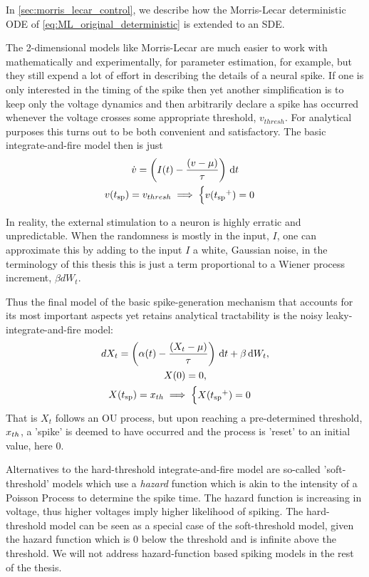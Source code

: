 In \cref{sec:morris_lecar_control}, we describe how the Morris-Lecar
deterministic ODE of \cref{eq:ML_original_deterministic} is extended to an SDE.   
 
The 2-dimensional models like Morris-Lecar are much easier to work with
mathematically and experimentally, for parameter estimation, for example, but
they still expend a lot of effort in describing the details of a neural spike.
If one is only interested in the timing of the spike then yet another
simplification is to keep only the voltage dynamics and then arbitrarily declare
a spike has occurred whenever the voltage crosses some appropriate threshold,
$v_{thresh}$. For analytical purposes this turns out to be both convenient and
satisfactory. The basic integrate-and-fire model then is just
\begin{equation}
\begin{gathered}
\dot{v} = \left(I(t) - \frac{(v - {\mu })}{{ \tau }} \right) \, \mathrm{d} t 
\\
v({ t_{\textrm{sp} } }) = v_{thresh} \implies  
\begin{cases}
v({ t_{\textrm{sp} } }^+) = 0 &  
\end{cases}
\end{gathered}
\label{eq:deterministic_IF}
\end{equation}

In reality, the external stimulation to a neuron is highly erratic and
unpredictable. When the randomness is mostly in the input, $I$,
one can approximate this by adding to the input $I$ a white, Gaussian
noise, in the terminology of this thesis this is just a term proportional to
a Wiener process increment, $\beta dW_t$.

Thus the final model of the basic spike-generation mechanism that accounts for
its most important aspects yet retains analytical tractability is the noisy
leaky-integrate-and-fire model:
\begin{equation}
\begin{gathered}
dX_t = \left(\alpha(t) - \frac{(X_t - {\mu })}{{ \tau }} \right) \, \mathrm{d} t + \beta \, \mathrm{d} W_t,
\\
X(0) = 0,
\\
X({ t_{\textrm{sp} } }) = { x_{th} } \implies  
\begin{cases}
X({ t_{\textrm{sp} } }^+) = 0 &  
\end{cases}
\end{gathered}
\label{eq:X_evolution_uo}
\end{equation}
That is $X_t$ follows an OU process, but upon reaching a pre-determined
threshold, ${ x_{th} }$, a 'spike' is deemed to have occurred and the process is
'reset' to an initial value, here $0$.

Alternatives to the hard-threshold integrate-and-fire model are so-called
'soft-threshold' models which use a {\sl hazard} function which is akin to the
intensity of a Poisson Process to determine the spike time. The hazard function
is increasing in voltage, thus higher voltages imply higher likelihood of
spiking. The hard-threshold model can be seen as a special case of the
soft-threshold model, given the hazard function which is 0 below the threshold
and is infinite above the threshold. We will not address hazard-function based
spiking models in the rest of the thesis. 
